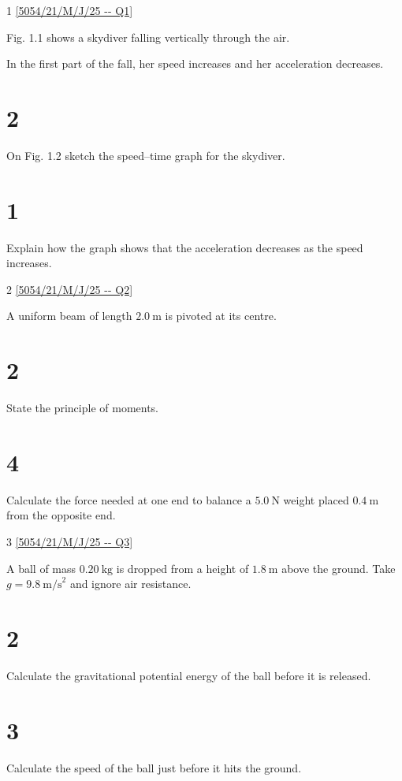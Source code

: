 \documentclass[11pt]{article}
\begin{document}
\subject{Physics}

\begin{question}{1}
\ref{5054/21/M/J/25 -- Q1}

\qtext
Fig. 1.1 shows a skydiver falling vertically through the air.


In the first part of the fall, her speed increases and her acceleration decreases.

\part{2} On Fig. 1.2 sketch the speed--time graph for the skydiver.

\part{1} Explain how the graph shows that the acceleration decreases as the speed increases.
\endq
\end{question}

\begin{question}{2}
\ref{5054/21/M/J/25 -- Q2}

\qtext
A uniform beam of length $2.0\ \text{m}$ is pivoted at its centre.

\part{2} State the principle of moments.

\part{4} Calculate the force needed at one end to balance a $5.0\ \text{N}$ weight placed $0.4\ \text{m}$ from the opposite end.
\endq
\end{question}

\begin{question}{3}
\ref{5054/21/M/J/25 -- Q3}

\qtext
A ball of mass $0.20\ \text{kg}$ is dropped from a height of $1.8\ \text{m}$
above the ground. Take $g = 9.8\ \text{m/s}^2$ and ignore air resistance.

\part{2} Calculate the gravitational potential energy of the ball before it is released.

\part{3} Calculate the speed of the ball just before it hits the ground.
\endq
\end{question}
\end{document}
